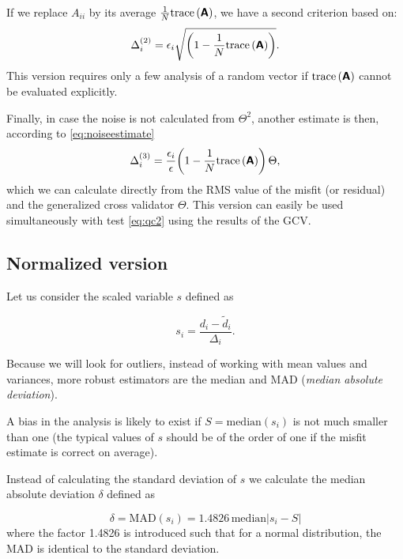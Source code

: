 If we replace $A_{ii}$ by its average $\frac{1}{N}\mathrm{trace}\left( \mbox{\boldmath $ \protect\mathsf{A} $} \right)$, we have a second criterion based on:
\begin{equation}
\Delta_i^{(2)} = \epsilon_i \sqrt{ \left({1-\frac{1}{N} \mathrm{trace}\left( \mbox{\boldmath $ \protect\mathsf{\mbox{\boldmath $ \protect\mathsf{A} $}} $} \right)}\right)}. 
\label{eq:qc2}
\end{equation}
This version requires only a few analysis of a random vector if $\mathrm{trace}\left( \mbox{\boldmath $ \protect\mathsf{A} $} \right)$ cannot be evaluated explicitly.


Finally, in case the noise is not calculated from $\Theta^2$, another estimate is then, according to \eqref{eq:noiseestimate}
\begin{equation}
\Delta_i^{(3)}= \frac{\epsilon_i}{\epsilon} { \left({1-\frac{1}{ N} \mathrm{trace}\left( \mbox{\boldmath $ \protect\mathsf{A} $} \right)}\right)}\, \Theta,
\label{eq:qc3}
\end{equation}
which we can calculate directly from the RMS value of the misfit (or residual) and the generalized cross validator $\Theta$. This version can easily be used simultaneously with test \eqref{eq:qc2} using the results of the GCV.

 
\subsection{Normalized version}

Let us consider the scaled variable $s$ defined as
 
\begin{equation}
s_i = \frac{d_i - \tilde{d}_i}{\Delta_i}.
\end{equation}
 
Because we will look for outliers, instead of working with mean values and variances, more robust 
estimators are the median and $\mathrm{MAD}$ (\textit{median absolute deviation}).
 
A bias in the analysis is likely to exist if $S=\mathrm{median}(s_i)$ is not much smaller than one
(the typical values of $s$ should be of the order of one if the misfit estimate is correct on average).
 
Instead of calculating the standard deviation of $s$ we calculate 
the median absolute deviation  $\delta$ defined as

\begin{equation}
\delta = \mathrm{MAD}(s_i)=1.4826 \, \mathrm{median}| s_i-  S |
\end{equation}
where the factor 1.4826 is introduced such that for a normal distribution, the MAD is identical to the standard deviation.
 

